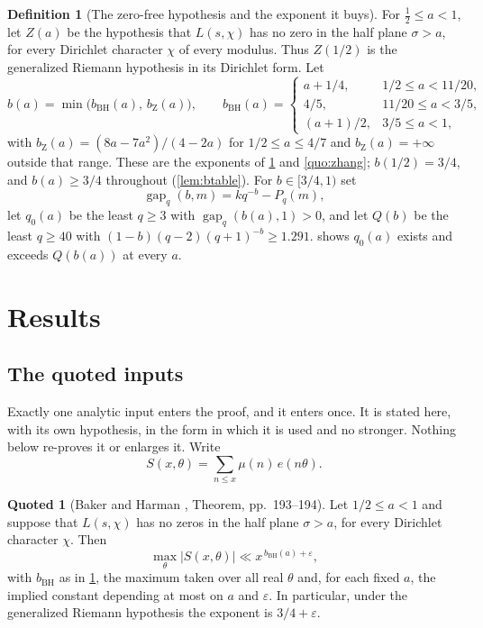 \documentclass[11pt]{amsart}
\theoremstyle{definition}
\newtheorem{definition}[theorem]{Definition}
\newtheorem{quoted}[theorem]{Quoted}
\theoremstyle{remark}
\begin{document}
\begin{definition}[The zero-free hypothesis and the exponent it buys]
\label{def:zfree}
For $\tfrac12 \le a < 1$, let $Z(a)$ be the hypothesis that $L(s,\chi)$ has no zero in the half plane $\sigma > a$, for every Dirichlet character $\chi$ of every modulus. Thus $Z(1/2)$ is the generalized Riemann hypothesis in its Dirichlet form. Let
\[
  b(a) = \min\bigl( b_{\mathrm{BH}}(a),\, b_{\mathrm Z}(a) \bigr),
  \qquad
  b_{\mathrm{BH}}(a) =
  \begin{cases}
    a + 1/4, & 1/2 \le a < 11/20, \\
    4/5, & 11/20 \le a < 3/5, \\
    (a+1)/2, & 3/5 \le a < 1,
  \end{cases}
\]
with $b_{\mathrm Z}(a) = (8a - 7a^2)/(4 - 2a)$ for $1/2 \le a \le 4/7$ and $b_{\mathrm Z}(a) = +\infty$ outside that range. These are the exponents of \cref{quo:bh} and \cref{quo:zhang}; $b(1/2) = 3/4$, and $b(a) \ge 3/4$ throughout (\cref{lem:btable}). For $b \in [3/4, 1)$ set
\[
  \operatorname{gap}_q(b, m) = k q^{-b} - P_q(m),
\]
let $q_0(a)$ be the least $q \ge 3$ with $\operatorname{gap}_q(b(a), 1) > 0$, and let $Q(b)$ be the least $q \ge 40$ with $(1-b)(q-2)(q+1)^{-b} \ge 1.291$.  shows $q_0(a)$ exists and exceeds $Q(b(a))$ at every $a$.
\end{definition}

\section{Results}
\label{sec:results}

\subsection*{The quoted inputs}

Exactly one analytic input enters the proof, and it enters once. It is stated here, with its own hypothesis, in the form in which it is used and no stronger. Nothing below re-proves it or enlarges it. Write
\[
  S(x, \theta) = \sum_{n \le x} \mu(n)\, e(n\theta) .
\]

\begin{quoted}[Baker and Harman \cite{bh}, Theorem, pp.\ 193--194]
\label{quo:bh}
Let $1/2 \le a < 1$ and suppose that $L(s,\chi)$ has no zeros in the half plane $\sigma > a$, for every Dirichlet character $\chi$. Then
\[
  \max_{\theta} |S(x, \theta)| \ll x^{\,b_{\mathrm{BH}}(a) + \varepsilon},
\]
with $b_{\mathrm{BH}}$ as in \cref{def:zfree}, the maximum taken over all real $\theta$ and, for each fixed $a$, the implied constant depending at most on $a$ and $\varepsilon$. In particular, under the generalized Riemann hypothesis the exponent is $3/4 + \varepsilon$.
\end{quoted}
\end{document}
